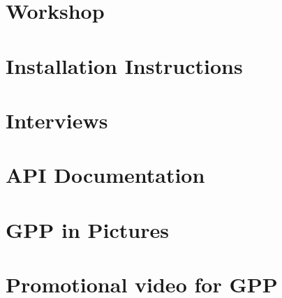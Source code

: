  \appendix

\chapter{Workshop}


\chapter{Installation Instructions}


\chapter{Interviews}


\chapter{API Documentation}


\chapter{GPP in Pictures}


\chapter{Promotional video for GPP}

